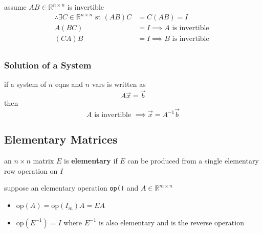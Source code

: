 		\begin{example}
			assume $AB\in\mathbb{R}^{n\times n}$ is invertible
			\begin{align*}
				\therefore\exists C\in\mathbb{R}^{n\times n}\text{ st }(AB)C&=C(AB)=I\\
				A(BC)&=I\implies A\text{ is invertible }\\
				(CA)B&=I\implies B\text{ is invertible }\\
			\end{align*}
		\end{example}
		\subsubsection{Solution of a System}
			\begin{theorem}
				if a system of $n$ eqns and  $n$ vars is written as
				$$A\vec x=\vec b$$
				then 
				$$A\text{ is invertible }\implies \vec x=A^{-1}\vec b$$
			\end{theorem}
	\subsection{Elementary Matrices}
		\begin{definition}
			an $n\times n$ matrix $E$ is \textbf{elementary} if $E$ can be produced from a single elementary row operation on $I$
		\end{definition}
		\begin{theorem}[Lemma]
			suppose an elementary operation \texttt{op()} and $A\in\mathbb{R}^{m\times n}$
			\begin{itemize}
				\item $\text{op}(A)=\text{op}(I_m)A=EA$
				\item $\text{op}(E^{-1})=I$ where $E^{-1}$ is also elementary and is the reverse operation
			\end{itemize}
		\end{theorem}
